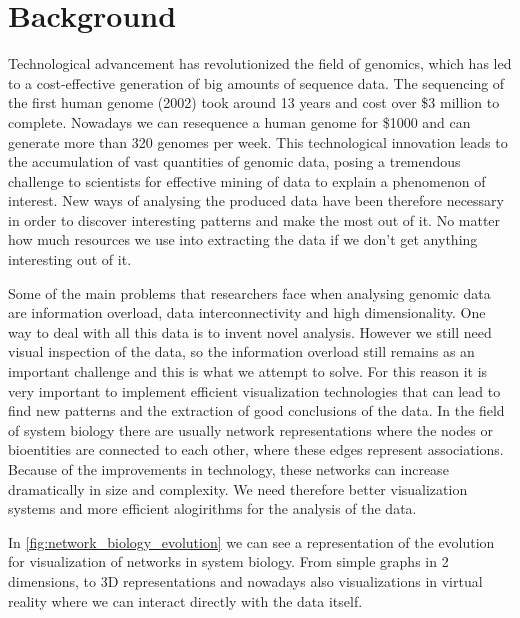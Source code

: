 \section{Background}
Technological advancement has revolutionized the field of genomics, which has led to a cost-effective generation of big amounts of sequence data. The sequencing of the first human genome (2002) took around 13 years and cost over \$3 million to complete. Nowadays we can resequence a human genome for \$1000 and can generate more than 320 genomes per week\cite{big_biological_impacts_bd}. This technological innovation leads to the accumulation of vast quantities of genomic data, posing a tremendous challenge to scientists for effective mining of data to explain a phenomenon of interest. New ways of analysing the produced data have been therefore necessary in order to discover interesting patterns  and make the most out of it. No matter how much resources we use into extracting the data if we don't get anything interesting out of it\cite{zhang_paciorkowski_craig_cui_2019}.

Some of the main problems that researchers face when analysing genomic data are information overload, data interconnectivity and high dimensionality. One way to deal with all this data is to invent novel analysis. However we still need visual inspection of the data, so the information overload still remains as an important challenge and this is what we attempt to solve. For this reason it is very important to implement efficient visualization technologies that can lead to find new patterns and the extraction of good conclusions of the data. In the field of system biology there are usually network representations where the nodes or bioentities are connected to each other, where these edges represent associations. Because of the improvements in technology, these networks can increase dramatically in size and complexity. We need therefore better visualization systems and more efficient alogirithms for the analysis of the data.

In \ref{fig:network_biology_evolution} we can see a representation of the evolution for visualization of networks in system biology. From simple graphs in 2 dimensions, to 3D representations and nowadays also visualizations in virtual reality where we can interact directly with the data itself.

